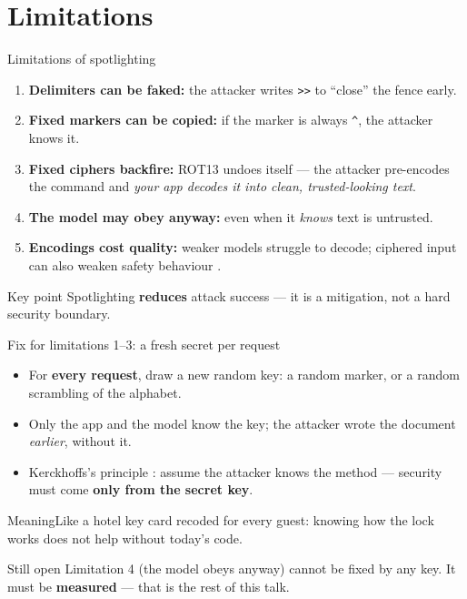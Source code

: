 \documentclass[aspectratio=169,11pt]{beamer}
\newcommand{\plain}[1]{\begin{block}{Meaning}#1\end{block}}
\begin{document}
\section{Limitations}

\begin{frame}{Limitations of spotlighting}
  \begin{enumerate}
    \item \textbf{Delimiters can be faked:} the attacker writes \texttt{>>} to ``close'' the fence early.
    \item \textbf{Fixed markers can be copied:} if the marker is always \texttt{\^{}}, the attacker knows it.
    \item \textbf{Fixed ciphers backfire:} ROT13 undoes itself --- the attacker pre-encodes the command and \emph{your app decodes it into clean, trusted-looking text}.
    \item \textbf{The model may obey anyway:} even when it \emph{knows} text is untrusted.
    \item \textbf{Encodings cost quality:} weaker models struggle to decode; ciphered input can also weaken safety behaviour \cite{yuan2024cipherchat}.
  \end{enumerate}
  \begin{alertblock}{Key point}
    Spotlighting \textbf{reduces} attack success --- it is a mitigation, not a hard security boundary.
  \end{alertblock}
\end{frame}

\begin{frame}{Fix for limitations 1--3: a fresh secret per request}
  \begin{itemize}
    \item For \textbf{every request}, draw a new random key: a random marker, or a random scrambling of the alphabet.
    \item Only the app and the model know the key; the attacker wrote the document \emph{earlier}, without it.
    \item Kerckhoffs's principle \cite{kerckhoffs1883}: assume the attacker knows the method --- security must come \textbf{only from the secret key}.
  \end{itemize}
  \vspace{0.5em}
  \plain{Like a hotel key card recoded for every guest: knowing how the lock works does not help without today's code.}
  \begin{alertblock}{Still open}
    Limitation 4 (the model obeys anyway) cannot be fixed by any key. It must be \textbf{measured} --- that is the rest of this talk.
  \end{alertblock}
\end{frame}
\end{document}
